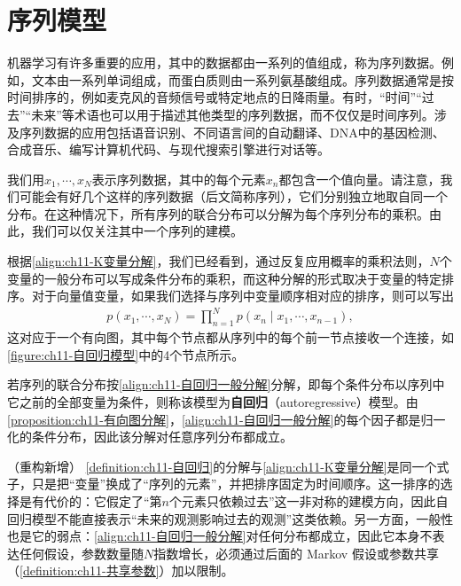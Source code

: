 \documentclass[../../main.tex]{subfiles}
\begin{document}
\section{序列模型}\label{section:ch11-序列模型}

机器学习有许多重要的应用，其中的数据都由一系列的值组成，称为序列数据。例如，文本由一系列单词组成，而蛋白质则由一系列氨基酸组成。序列数据通常是按时间排序的，例如麦克风的音频信号或特定地点的日降雨量。有时，“时间”“过去”“未来”等术语也可以用于描述其他类型的序列数据，而不仅仅是时间序列。涉及序列数据的应用包括语音识别、不同语言间的自动翻译、DNA中的基因检测、合成音乐、编写计算机代码、与现代搜索引擎进行对话等。

我们用$x_1,\cdots,x_N$表示序列数据，其中的每个元素$x_n$都包含一个值向量。请注意，我们可能会有好几个这样的序列数据（后文简称序列），它们分别独立地取自同一个分布。在这种情况下，所有序列的联合分布可以分解为每个序列分布的乘积。由此，我们可以仅关注其中一个序列的建模。

根据\eqref{align:ch11-K变量分解}，我们已经看到，通过反复应用概率的乘积法则，$N$个变量的一般分布可以写成条件分布的乘积，而这种分解的形式取决于变量的特定排序。对于向量值变量，如果我们选择与序列中变量顺序相对应的排序，则可以写出
\begin{align}
  p(x_1,\cdots,x_N) = \prod_{n=1}^{N}p(x_n\mid x_1,\cdots,x_{n-1}),
  \label{align:ch11-自回归一般分解}
\end{align}
这对应于一个有向图，其中每个节点都从序列中的每个前一节点接收一个连接，如\cref{figure:ch11-自回归模型}中的4个节点所示。

\begin{definition}[自回归模型]\label{definition:ch11-自回归}
若序列的联合分布按\eqref{align:ch11-自回归一般分解}分解，即每个条件分布以序列中它之前的全部变量为条件，则称该模型为\textbf{自回归}（autoregressive）模型。由\cref{proposition:ch11-有向图分解}，\eqref{align:ch11-自回归一般分解}的每个因子都是归一化的条件分布，因此该分解对任意序列分布都成立。
\end{definition}

\begin{remark}（重构新增）
\cref{definition:ch11-自回归}的分解与\eqref{align:ch11-K变量分解}是同一个式子，只是把“变量”换成了“序列的元素”，并把排序固定为时间顺序。这一排序的选择是有代价的：它假定了“第$n$个元素只依赖过去”这一非对称的建模方向，因此自回归模型不能直接表示“未来的观测影响过去的观测”这类依赖。另一方面，一般性也是它的弱点：\eqref{align:ch11-自回归一般分解}对任何分布都成立，因此它本身不表达任何假设，参数数量随$N$指数增长，必须通过后面的 Markov 假设或参数共享（\cref{definition:ch11-共享参数}）加以限制。
\end{remark}
\end{document}
